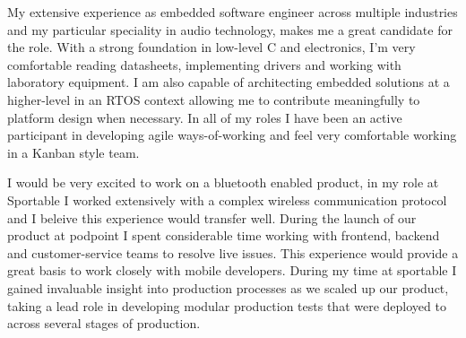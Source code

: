 \documentclass[11pt, a4paper]{awesome-cv}
\begin{document}
\begin{cvletter}

My extensive experience as embedded software engineer across multiple industries and my particular speciality in audio technology, makes me a great candidate for the role. 
With a strong foundation in low-level C and electronics, I’m very comfortable reading datasheets, implementing drivers and working with laboratory equipment. I am also capable of architecting embedded solutions at a higher-level in an RTOS context allowing me to contribute meaningfully to platform design when necessary.
In all of my roles I have been an active participant in developing agile ways-of-working and feel very comfortable working in a Kanban style team.

I would be very excited to work on a bluetooth enabled product, in my role at Sportable I worked extensively with a complex wireless communication protocol and I beleive this experience would transfer well.
During the launch of our product at podpoint I spent considerable time working with frontend, backend and customer-service teams to resolve live issues. This experience would provide a great basis to work closely with mobile developers.
During my time at sportable I gained invaluable insight into production processes as we scaled up our product, taking a lead role in developing modular production tests that were deployed to across several stages of production.

\end{cvletter}


\makeletterclosing
\end{document}
